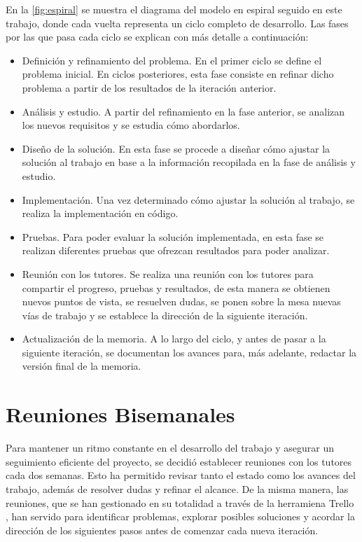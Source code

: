 En la \autoref{fig:espiral} se muestra el diagrama del modelo en espiral seguido en este trabajo, donde cada vuelta representa un ciclo completo de desarrollo. Las fases por las que pasa cada ciclo se explican con más detalle a continuación:

\begin{itemize}
    \item Definición y refinamiento del problema. En el primer ciclo se define el problema inicial. En ciclos posteriores, esta fase consiste en refinar dicho problema a partir de los resultados de la iteración anterior.
    \item Análisis y estudio. A partir del refinamiento en la fase anterior, se analizan los nuevos requisitos y se estudia cómo abordarlos.
    \item Diseño de la solución. En esta fase se procede a diseñar cómo ajustar la solución al trabajo en base a la información recopilada en la fase de análisis y estudio.
    \item Implementación. Una vez determinado cómo ajustar la solución al trabajo, se realiza la implementación en código.
    \item Pruebas. Para poder evaluar la solución implementada, en esta fase se realizan diferentes pruebas que ofrezcan resultados para poder analizar.
    \item Reunión con los tutores. Se realiza una reunión con los tutores para compartir el progreso, pruebas y resultados, de esta manera se obtienen nuevos puntos de vista, se resuelven dudas, se ponen sobre la mesa nuevas vías de trabajo y se establece la dirección de la siguiente iteración.
    \item Actualización de la memoria. A lo largo del ciclo, y antes de pasar a la siguiente iteración, se documentan los avances para, más adelante, redactar la versión final de la memoria.
\end{itemize}

\section{Reuniones Bisemanales}

Para mantener un ritmo constante en el desarrollo del trabajo y asegurar un seguimiento eficiente del proyecto, se decidió establecer reuniones con los tutores cada dos semanas. Esto ha permitido revisar tanto el estado como los avances del trabajo, además de resolver dudas y refinar el alcance. De la misma manera, las reuniones, que se han gestionado en su totalidad a través de la herramiena Trello \cite{trello}, han servido para identificar problemas, explorar posibles soluciones y acordar la dirección de los siguientes pasos antes de comenzar cada nueva iteración.

